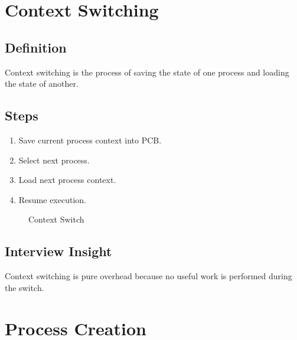 \section{Context Switching}

\subsection{Definition}

Context switching is the process of saving the state of one process and loading the state of another.

\subsection{Steps}

\begin{enumerate}
\item Save current process context into PCB.
\item Select next process.
\item Load next process context.
\item Resume execution.
\end{enumerate}

\begin{figure}[H]
\centering
{}
\caption{Context Switch}
\end{figure}

\subsection{Interview Insight}

Context switching is pure overhead because no useful work is performed during the switch.

\section{Process Creation}

